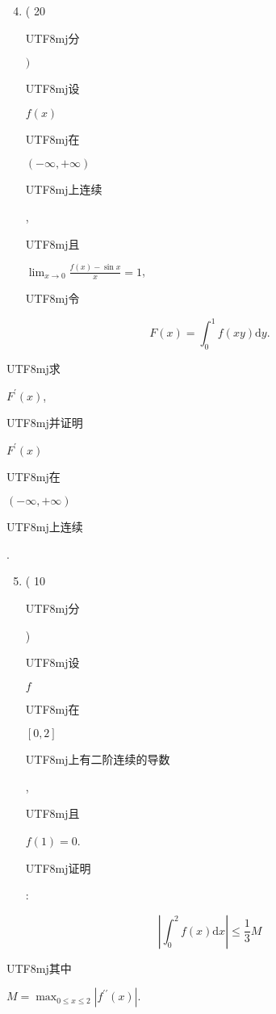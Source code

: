 \documentclass[10pt]{article}
\begin{document}
\begin{enumerate}
  \setcounter{enumi}{3}
  \item ( 20 \begin{CJK}{UTF8}{mj}分\end{CJK} $)$ \begin{CJK}{UTF8}{mj}设\end{CJK} $f(x)$ \begin{CJK}{UTF8}{mj}在\end{CJK} $(-\infty,+\infty)$ \begin{CJK}{UTF8}{mj}上连续\end{CJK}, \begin{CJK}{UTF8}{mj}且\end{CJK} $\lim _{x \rightarrow 0} \frac{f(x)-\sin x}{x}=1$, \begin{CJK}{UTF8}{mj}令\end{CJK}
\end{enumerate}
$$
F(x)=\int_{0}^{1} f(x y) \mathrm{d} y .
$$
\begin{CJK}{UTF8}{mj}求\end{CJK} $F^{\prime}(x)$, \begin{CJK}{UTF8}{mj}并证明\end{CJK} $F^{\prime}(x)$ \begin{CJK}{UTF8}{mj}在\end{CJK} $(-\infty,+\infty)$ \begin{CJK}{UTF8}{mj}上连续\end{CJK}.

\begin{enumerate}
  \setcounter{enumi}{4}
  \item ( 10 \begin{CJK}{UTF8}{mj}分\end{CJK}) \begin{CJK}{UTF8}{mj}设\end{CJK} $f$ \begin{CJK}{UTF8}{mj}在\end{CJK} $[0,2]$ \begin{CJK}{UTF8}{mj}上有二阶连续的导数\end{CJK}, \begin{CJK}{UTF8}{mj}且\end{CJK} $f(1)=0$. \begin{CJK}{UTF8}{mj}证明\end{CJK}:
\end{enumerate}
$$
\left|\int_{0}^{2} f(x) \mathrm{d} x\right| \leqslant \frac{1}{3} M
$$
\begin{CJK}{UTF8}{mj}其中\end{CJK} $M=\max _{0 \leqslant x \leqslant 2}\left|f^{\prime \prime}(x)\right|$.
\end{document}
